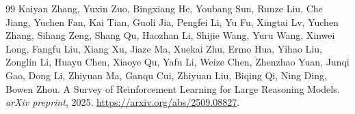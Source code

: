 \begin{thebibliography}{99}
 Kaiyan Zhang, Yuxin Zuo, Bingxiang He, Youbang Sun, Runze Liu, Che Jiang, Yuchen Fan, Kai Tian, Guoli Jia, Pengfei Li, Yu Fu, Xingtai Lv, Yuchen Zhang, Sihang Zeng, Shang Qu, Haozhan Li, Shijie Wang, Yuru Wang, Xinwei Long, Fangfu Liu, Xiang Xu, Jiaze Ma, Xuekai Zhu, Ermo Hua, Yihao Liu, Zonglin Li, Huayu Chen, Xiaoye Qu, Yafu Li, Weize Chen, Zhenzhao Yuan, Junqi Gao, Dong Li, Zhiyuan Ma, Ganqu Cui, Zhiyuan Liu, Biqing Qi, Ning Ding, Bowen Zhou. A Survey of Reinforcement Learning for Large Reasoning Models. \emph{arXiv preprint}, 2025. \url{https://arxiv.org/abs/2509.08827}.
\end{thebibliography}
\endgroup

